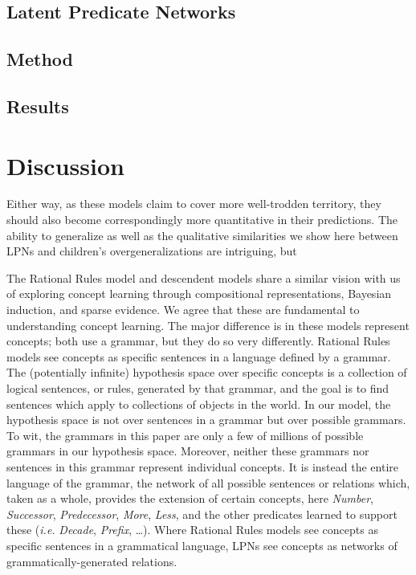 \documentclass[10pt,letterpaper]{article}
\begin{document}

\subsection{Latent Predicate Networks}


\subsection{Method}


\subsection{Results}


\section{Discussion}


Either way, as these models claim to cover more well-trodden
territory, they should also become correspondingly more quantitative
in their predictions. The ability to generalize as well as the
qualitative similarities we show here between LPNs and children's
overgeneralizations are intriguing, but 


The Rational Rules model and descendent models
\citep{goodman2008rational,T.D.Ullman:2012:1b1b6,PianGoodTen2012}
share a similar vision with us of exploring concept learning through
compositional representations, Bayesian induction, and sparse
evidence. We agree that these are fundamental to understanding concept
learning. The major difference is in these models represent concepts;
both use a grammar, but they do so very differently. Rational Rules
models see concepts as specific sentences in a language defined by a
grammar. The (potentially infinite) hypothesis space over specific
concepts is a collection of logical sentences, or rules, generated by
that grammar, and the goal is to find sentences which apply to
collections of objects in the world. In our model, the hypothesis
space is not over sentences in a grammar but over possible grammars.
To wit, the grammars in this paper are only a few of millions of
possible grammars in our hypothesis space. Moreover, neither these
grammars nor sentences in this grammar represent individual concepts.
It is instead the entire language of the grammar, the network of all
possible sentences or relations which, taken as a whole, provides the
extension of certain concepts, here \emph{Number}, \emph{Successor},
\emph{Predecessor}, \emph{More}, \emph{Less}, and the other predicates
learned to support these ({\it i.e.} \emph{Decade}, \emph{Prefix},
\ldots). Where Rational Rules models see concepts as specific
sentences in a grammatical language, LPNs see concepts as networks of
grammatically-generated relations.
\end{document}
